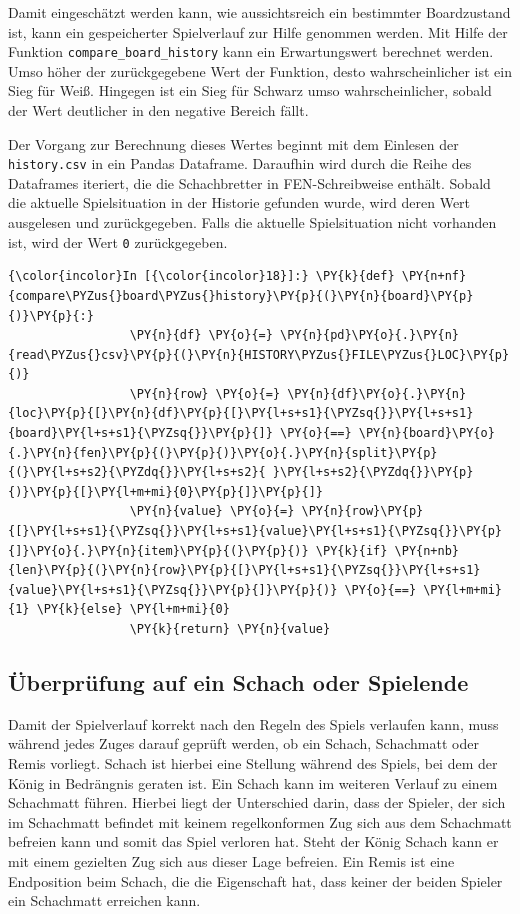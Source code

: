     Damit eingeschätzt werden kann, wie aussichtsreich ein bestimmter
Boardzustand ist, kann ein gespeicherter Spielverlauf zur Hilfe genommen
werden. Mit Hilfe der Funktion \texttt{compare\_board\_history} kann ein
Erwartungswert berechnet werden. Umso höher der zurückgegebene Wert der
Funktion, desto wahrscheinlicher ist ein Sieg für Weiß. Hingegen ist ein
Sieg für Schwarz umso wahrscheinlicher, sobald der Wert deutlicher in
den negative Bereich fällt.

Der Vorgang zur Berechnung dieses Wertes beginnt mit dem Einlesen der
\texttt{history.csv} in ein Pandas Dataframe. Daraufhin wird durch die
Reihe des Dataframes iteriert, die die Schachbretter in FEN-Schreibweise
enthält. Sobald die aktuelle Spielsituation in der Historie gefunden
wurde, wird deren Wert ausgelesen und zurückgegeben. Falls die aktuelle
Spielsituation nicht vorhanden ist, wird der Wert \texttt{0}
zurückgegeben.

    \begin{Verbatim}[commandchars=\\\{\}]
{\color{incolor}In [{\color{incolor}18}]:} \PY{k}{def} \PY{n+nf}{compare\PYZus{}board\PYZus{}history}\PY{p}{(}\PY{n}{board}\PY{p}{)}\PY{p}{:}
                 \PY{n}{df} \PY{o}{=} \PY{n}{pd}\PY{o}{.}\PY{n}{read\PYZus{}csv}\PY{p}{(}\PY{n}{HISTORY\PYZus{}FILE\PYZus{}LOC}\PY{p}{)}
                 \PY{n}{row} \PY{o}{=} \PY{n}{df}\PY{o}{.}\PY{n}{loc}\PY{p}{[}\PY{n}{df}\PY{p}{[}\PY{l+s+s1}{\PYZsq{}}\PY{l+s+s1}{board}\PY{l+s+s1}{\PYZsq{}}\PY{p}{]} \PY{o}{==} \PY{n}{board}\PY{o}{.}\PY{n}{fen}\PY{p}{(}\PY{p}{)}\PY{o}{.}\PY{n}{split}\PY{p}{(}\PY{l+s+s2}{\PYZdq{}}\PY{l+s+s2}{ }\PY{l+s+s2}{\PYZdq{}}\PY{p}{)}\PY{p}{[}\PY{l+m+mi}{0}\PY{p}{]}\PY{p}{]}
                 \PY{n}{value} \PY{o}{=} \PY{n}{row}\PY{p}{[}\PY{l+s+s1}{\PYZsq{}}\PY{l+s+s1}{value}\PY{l+s+s1}{\PYZsq{}}\PY{p}{]}\PY{o}{.}\PY{n}{item}\PY{p}{(}\PY{p}{)} \PY{k}{if} \PY{n+nb}{len}\PY{p}{(}\PY{n}{row}\PY{p}{[}\PY{l+s+s1}{\PYZsq{}}\PY{l+s+s1}{value}\PY{l+s+s1}{\PYZsq{}}\PY{p}{]}\PY{p}{)} \PY{o}{==} \PY{l+m+mi}{1} \PY{k}{else} \PY{l+m+mi}{0}
                 \PY{k}{return} \PY{n}{value}
\end{Verbatim}


    \subsection{Überprüfung auf ein Schach oder
Spielende}\label{uxfcberpruxfcfung-auf-ein-schach-oder-spielende}

Damit der Spielverlauf korrekt nach den Regeln des Spiels verlaufen
kann, muss während jedes Zuges darauf geprüft werden, ob ein Schach,
Schachmatt oder Remis vorliegt. Schach ist hierbei eine Stellung während
des Spiels, bei dem der König in Bedrängnis geraten ist. Ein Schach kann
im weiteren Verlauf zu einem Schachmatt führen. Hierbei liegt der
Unterschied darin, dass der Spieler, der sich im Schachmatt befindet mit
keinem regelkonformen Zug sich aus dem Schachmatt befreien kann und
somit das Spiel verloren hat. Steht der König Schach kann er mit einem
gezielten Zug sich aus dieser Lage befreien. Ein Remis ist eine
Endposition beim Schach, die die Eigenschaft hat, dass keiner der beiden
Spieler ein Schachmatt erreichen kann.

